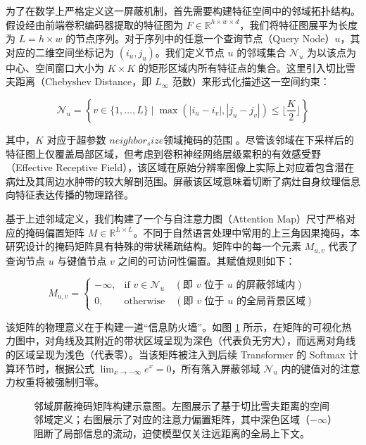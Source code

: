 \documentclass[Win]{xjtuBSThesis}  %
\begin{document}
为了在数学上严格定义这一屏蔽机制，首先需要构建特征空间中的邻域拓扑结构。假设经由前端卷积编码器提取的特征图为 $F \in \mathbb{R}^{h \times w \times d}$，我们将特征图展平为长度为 $L = h \times w$ 的节点序列。对于序列中的任意一个查询节点（Query Node）$u$，其对应的二维空间坐标记为 $(i_u, j_u)$。我们定义节点 $u$ 的邻域集合 $\mathcal{N}_u$ 为以该点为中心、空间窗口大小为 $K \times K$ 的矩形区域内所有特征点的集合。这里引入切比雪夫距离（Chebyshev Distance，即 $L_\infty$ 范数）来形式化描述这一空间约束：

\begin{equation}
    \mathcal{N}_u = \left\{ v \in \{1, \dots, L\} \mid \max(|i_u - i_v|, |j_u - j_v|) \le \lfloor \frac{K}{2} \rfloor \right\}
\end{equation}

其中，$K$ 对应于超参数 $neighbor_size$领域掩码的范围 。尽管该邻域在下采样后的特征图上仅覆盖局部区域，但考虑到卷积神经网络层级累积的有效感受野（Effective Receptive Field），该区域在原始分辨率图像上实际上对应着包含潜在病灶及其周边水肿带的较大解剖范围。屏蔽该区域意味着切断了病灶自身纹理信息向特征表达传播的物理路径。

基于上述邻域定义，我们构建了一个与自注意力图（Attention Map）尺寸严格对应的掩码偏置矩阵 $M \in \mathbb{R}^{L \times L}$。不同于自然语言处理中常用的上三角因果掩码，本研究设计的掩码矩阵具有特殊的带状稀疏结构。矩阵中的每一个元素 $M_{u,v}$ 代表了查询节点 $u$ 与键值节点 $v$ 之间的可访问性偏置。其赋值规则如下：

\begin{equation}
    M_{u,v} = 
    \begin{cases} 
    -\infty, & \text{if } v \in \mathcal{N}_u \quad (\text{即 } v \text{ 位于 } u \text{ 的屏蔽邻域内}) \\
    0, & \text{otherwise} \quad (\text{即 } v \text{ 位于 } u \text{ 的全局背景区域})
    \end{cases}
\end{equation}

该矩阵的物理意义在于构建一道“信息防火墙”。如图 \ref{fig:mask_matrix_construction} 所示，在矩阵的可视化热力图中，对角线及其附近的带状区域呈现为深色（代表负无穷大），而远离对角线的区域呈现为浅色（代表零）。当该矩阵被注入到后续 Transformer 的 Softmax 计算环节时，根据公式 $\lim_{x \to -\infty} e^x = 0$，所有落入屏蔽邻域 $\mathcal{N}_u$ 内的键值对的注意力权重将被强制归零。

\begin{figure}[htbp]
    \centering
    \caption{邻域屏蔽掩码矩阵构建示意图。左图展示了基于切比雪夫距离的空间邻域定义；右图展示了对应的注意力偏置矩阵，其中深色区域（$-\infty$）阻断了局部信息的流动，迫使模型仅关注远距离的全局上下文。}
    \label{fig:mask_matrix_construction}
\end{figure}
\end{document}
